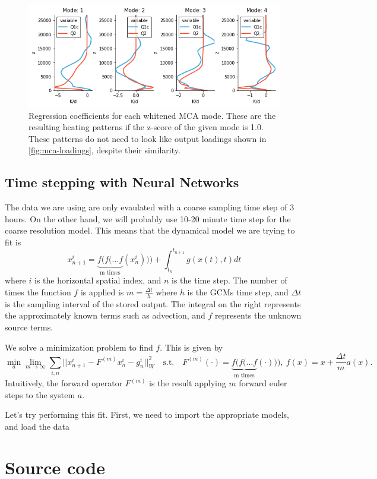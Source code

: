 \documentclass{report}
\begin{document}
\begin{figure}[ht]
  \centering
  \includegraphics[width=5in]{images/mca-regression-coef}
  \caption{\label{fig:mca-regression-coef}Regression coefficients for each
    whitened MCA mode. 
    These are the resulting heating patterns if the z-score of the given mode is
    1.0. 
    These patterns do not need to look like output loadings shown in
    \autoref{fig:mca-loadings}, despite their similarity.}
\end{figure}

\section{Time stepping with Neural Networks}

The data we are using are only evaulated with a coarse sampling time step of 3 hours. On the other hand, we will probably use 10-20 minute time step for the coarse resolution model. This means that the dynamical model we are trying to fit is 
$$ x^i_{n+1} = \underbrace{f(f(\ldots f}_{\text{m times}}(x^i_n))) + \int_{t_n}^{t_{n+1}} g(x(t), t) dt$$ 
where $i$ is the horizontal spatial index, and $n$ is the time step. The number of times the function $f$ is applied is $m=\frac{\Delta t}{h}$ where $h$ is the GCMs time step, and $\Delta t$ is the sampling interval of the stored output. The integral on the right represents the approximately known terms such as advection, and $f$ represents the unknown source terms.

We solve a minimization problem to find $f$. This is given by 
$$
\min_{a} \lim_{m \rightarrow \infty} \sum_{i,n} ||x^{i}_{n+1} - F^{(m)} x^i_{n} - g_n^{i}||_W^2 \quad \text{s.t.}\quad F^{(m)}(\cdot) = \underbrace{f(f(\ldots f}_{\text{m times}}(\cdot))),\ f(x) = x +  \frac{ \Delta t}{m} a(x).
$$
Intuitively, the forward operator $F^{(m)}$ is the result applying $m$ forward euler steps to the system $a$.

Let's try performing this fit. First, we need to import the appropriate models, and load the data


\printbibliography
\appendix

\chapter{Source code}
\label{sec:source}

% 
\end{document}
